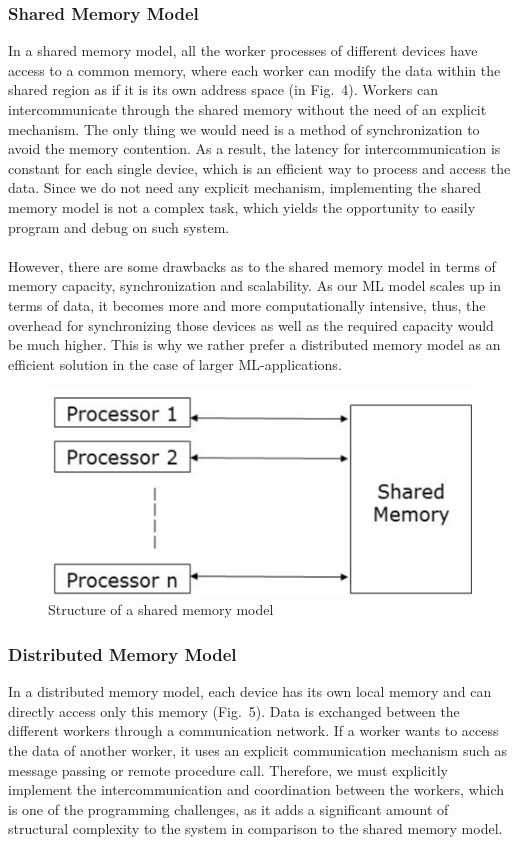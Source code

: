 \documentclass[ieeetran]{article}
\begin{document}
\subsubsection{Shared Memory Model} %
\label{ssub:shared_memory_model}
In a shared memory model, all the worker processes of different devices have access to a common memory, where each worker can modify the data within the shared region as if it is its own address space (in Fig.\ 4). Workers can intercommunicate through the shared memory without the need of an explicit mechanism. The only thing we would need is a method of synchronization to avoid the memory contention. As a result, the latency for intercommunication is constant for each single device, which is an efficient way to process and access the data. Since we do not need any explicit mechanism, implementing the shared memory model is not a complex task, which yields the opportunity to easily program and debug on such system. 
\\ \\However, there are some drawbacks as to the shared memory model in terms of memory capacity, synchronization and scalability. As our ML model scales up in terms of data, it becomes more and more computationally intensive, thus, the overhead for synchronizing those devices as well as the required capacity would be much higher. This is why we rather prefer a distributed memory model as an efficient solution in the case of larger ML-applications.



\begin{figure}[h!]
  \centering
  \includegraphics[width=0.4\linewidth]{sharedmemorymodel}
  \caption{Structure of a shared memory model}
  \label{fig:sharedmemorymodel}
\end{figure}


\subsubsection{Distributed Memory Model} %
\label{ssub:distributed_memory_model}
In a distributed memory model, each device has its own local memory and can directly access only this memory (Fig.\ 5). Data is exchanged between the different workers through a communication network. If a worker wants to access the data of another worker, it uses an explicit communication mechanism such as message passing or remote procedure call. Therefore, we must explicitly implement the intercommunication and coordination between the workers, which is one of the programming challenges, as it adds a significant amount of structural complexity to the system in comparison to the shared memory model. 
\end{document}

